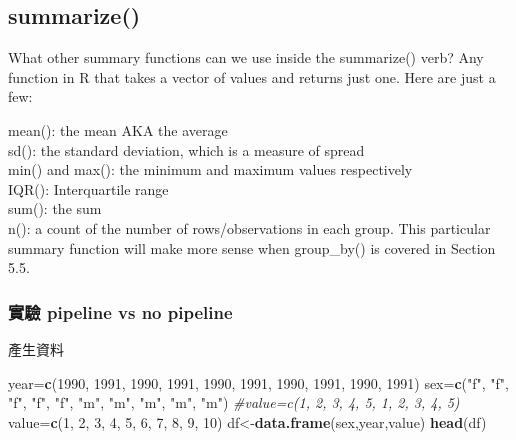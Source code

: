\documentclass[]{book}
\newenvironment{Shaded}{\begin{snugshade}}{\end{snugshade}}
\newcommand{\KeywordTok}[1]{\textcolor[rgb]{0.13,0.29,0.53}{\textbf{#1}}}
\newcommand{\DecValTok}[1]{\textcolor[rgb]{0.00,0.00,0.81}{#1}}
\newcommand{\StringTok}[1]{\textcolor[rgb]{0.31,0.60,0.02}{#1}}
\newcommand{\CommentTok}[1]{\textcolor[rgb]{0.56,0.35,0.01}{\textit{#1}}}
\newcommand{\OperatorTok}[1]{\textcolor[rgb]{0.81,0.36,0.00}{\textbf{#1}}}
\newcommand{\NormalTok}[1]{#1}
\theoremstyle{definition}
\theoremstyle{definition}
\theoremstyle{definition}
\theoremstyle{remark}
\begin{document}
\begin{Shaded}
\end{Shaded}

\subsection{summarize()}\label{summarize}

What other summary functions can we use inside the summarize() verb? Any
function in R that takes a vector of values and returns just one. Here
are just a few:

mean(): the mean AKA the average\\
sd(): the standard deviation, which is a measure of spread\\
min() and max(): the minimum and maximum values respectively\\
IQR(): Interquartile range\\
sum(): the sum\\
n(): a count of the number of rows/observations in each group. This
particular summary function will make more sense when group\_by() is
covered in Section 5.5.

\subsubsection{實驗 pipeline vs no
pipeline}\label{-pipeline-vs-no-pipeline}

產生資料

\begin{Shaded}
\begin{Highlighting}[]
\NormalTok{year=}\KeywordTok{c}\NormalTok{(}\DecValTok{1990}\NormalTok{,    }\DecValTok{1991}\NormalTok{,   }\DecValTok{1990}\NormalTok{,   }\DecValTok{1991}\NormalTok{,   }\DecValTok{1990}\NormalTok{,   }\DecValTok{1991}\NormalTok{,   }\DecValTok{1990}\NormalTok{,   }\DecValTok{1991}\NormalTok{,   }\DecValTok{1990}\NormalTok{,   }\DecValTok{1991}\NormalTok{) }
\NormalTok{sex=}\KeywordTok{c}\NormalTok{(}\StringTok{"f"}\NormalTok{,  }\StringTok{"f"}\NormalTok{,    }\StringTok{"f"}\NormalTok{,    }\StringTok{"f"}\NormalTok{,    }\StringTok{"f"}\NormalTok{,    }\StringTok{"m"}\NormalTok{,    }\StringTok{"m"}\NormalTok{,    }\StringTok{"m"}\NormalTok{,    }\StringTok{"m"}\NormalTok{,    }\StringTok{"m"}\NormalTok{)}
\CommentTok{#value=c(1, 2,  3,  4,  5,  1,  2,  3,  4,  5)}
\NormalTok{value=}\KeywordTok{c}\NormalTok{(}\DecValTok{1}\NormalTok{,  }\DecValTok{2}\NormalTok{,  }\DecValTok{3}\NormalTok{,  }\DecValTok{4}\NormalTok{,  }\DecValTok{5}\NormalTok{,  }\DecValTok{6}\NormalTok{,  }\DecValTok{7}\NormalTok{,  }\DecValTok{8}\NormalTok{,  }\DecValTok{9}\NormalTok{,  }\DecValTok{10}\NormalTok{)}
\NormalTok{df<-}\KeywordTok{data.frame}\NormalTok{(sex,year,value)}
\KeywordTok{head}\NormalTok{(df)}
\end{Highlighting}
\end{Shaded}
\end{document}
